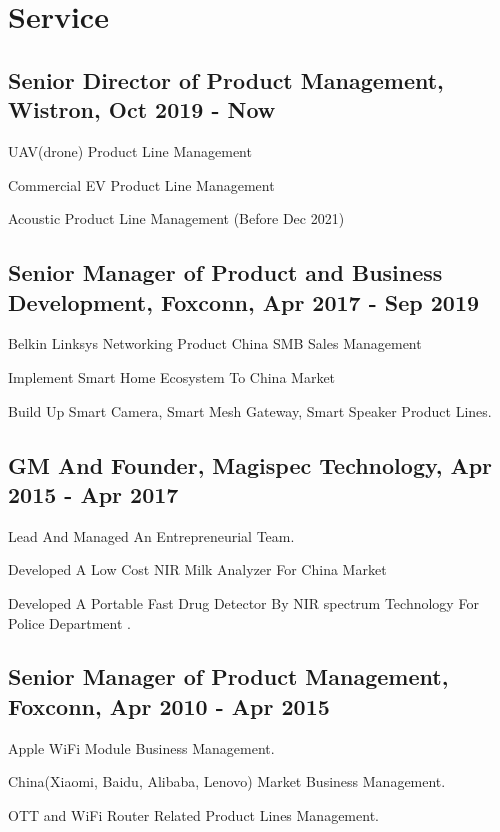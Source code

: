 \documentclass[12pt,a4paper]{report}
\newcommand{\listitemspace}{0.25em} %
\renewenvironment{itemize} %
{\begin{list}{}{\setlength{\leftmargin}{0em}
                \setlength{\parskip}{0em}
                \setlength{\itemsep}{\listitemspace}
                \setlength{\parsep}{\listitemspace}}}
{\end{list}}
\begin{document}
    \section*{Service}
    \subsection*{Senior Director of Product Management, Wistron, Oct 2019 - Now}
    \begin{itemize}
        \item UAV(drone) Product Line Management
        \item Commercial EV Product Line Management
        \item Acoustic Product Line Management (Before Dec 2021)
    \end{itemize}
    \subsection*{Senior Manager of Product and Business Development, Foxconn, Apr 2017 - Sep 2019}
    \begin{itemize}
        \item Belkin Linksys Networking Product China SMB Sales Management
        \item Implement Smart Home Ecosystem To China Market
        \item Build Up Smart Camera, Smart Mesh Gateway, Smart Speaker Product Lines.
    \end{itemize}
    \subsection*{GM And Founder, Magispec Technology, Apr 2015 - Apr 2017}
    \begin{itemize}
        \item Lead And Managed An Entrepreneurial Team.
        \item Developed A Low Cost NIR Milk Analyzer For China Market 
        \item Developed A Portable Fast Drug Detector By NIR spectrum Technology For Police Department .
    \end{itemize}
    \subsection*{Senior Manager of Product Management, Foxconn, Apr 2010 - Apr 2015}
    \begin{itemize}
        \item Apple WiFi Module Business Management. 
        \item China(Xiaomi, Baidu, Alibaba, Lenovo) Market Business Management.
        \item OTT and WiFi Router Related Product Lines Management.
    \end{itemize}
\end{document}
